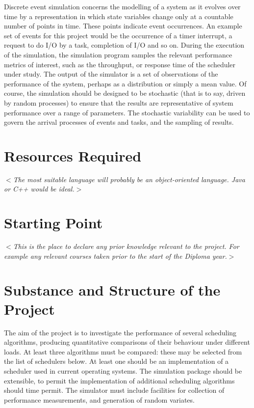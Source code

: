 \documentclass[12pt]{article}
\newcommand{\al}{$<$}
\newcommand{\ar}{$>$}
\begin{document}
Discrete event simulation concerns the modelling of a system as it
evolves over time by a representation in which state variables change
only at a countable number of points in time.  These points indicate
event occurrences.  An example set of events for this project would be
the occurrence of a timer interrupt, a request to do I/O by a task,
completion of I/O and so on.  During the execution of the simulation,
the simulation program samples the relevant performance metrics of
interest, such as the throughput, or response time of the scheduler
under study.  The output of the simulator is a set of observations of
the performance of the system, perhaps as a distribution or simply a
mean value.  Of course, the simulation should be designed to be
stochastic (that is to say, driven by random processes) to ensure that
the results are representative of system performance over a range of
parameters.  The stochastic variability can be used to govern the
arrival processes of events and tasks, and the sampling of results.


\section*{Resources Required}

\al\emph{The most suitable language will probably be an object-oriented
  language.  Java or C++ would be ideal.}\ar


\section*{Starting Point}

\al\emph{This is the place to declare any prior knowledge relevant to
  the project.  For example any relevant courses taken prior to the
  start of the Diploma year.}\ar


\section*{Substance and Structure of the Project}

The aim of the project is to investigate the performance of several
scheduling algorithms, producing quantitative comparisons of their
behaviour under different loads.  At least three algorithms must be
compared: these may be selected from the list of schedulers below.  At
least one should be an implementation of a scheduler used in current
operating systems.  The simulation package should be extensible, to
permit the implementation of additional scheduling algorithms should
time permit. The simulator must include facilities for collection of
performance measurements, and generation of random variates.
\end{document}
